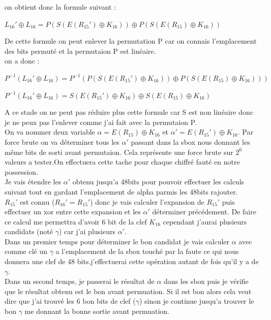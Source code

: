 \documentclass[a4paper]{report}
\begin{document}
			\newpage
			on obtient donc la formule suivant :
			\begin{center}$L_{16}'\oplus L_{16} = P(S(E(R_{15}')\oplus K_{16}))\oplus P(S(E(R_{15})\oplus K_{16})) $\end{center}
			
			De cette formule on peut enlever la permutation P car on connais l'emplacement des bits permuté et la permutaion P est linéaire.\\
			on a donc :
			\begin{center}$P^{-1}(L_{16}'\oplus L_{16}) =P^{-1}( P(S(E(R_{15}')\oplus K_{16}))\oplus P(S(E(R_{15})\oplus K_{16}))) $\end{center}
			\begin{center}$P^{-1}(L_{16}'\oplus L_{16}) =S(E(R_{15}')\oplus K_{16})\oplus S(E(R_{15})\oplus K_{16}) $\end{center}
			
			A ce stade on ne peut pas réduire plus cette formule car S est non linéaire donc je ne peux pas l'enlever comme j'ai fait avec la permutaion P.\\
			On va nommer deux variable $\alpha = E(R_{15})\oplus K_{16}$ et $\alpha' = E(R_{15}')\oplus K_{16}$.
			Par force brute on va déterminer tous les $\alpha'$ passant dans la sbox nous donnant les même bits de sorti avant permutaion. Cela représente une force brute sur $2^{6}$valeurs a tester.On effectuera cette tache pour chaque chiffré fauté en notre possession.\\
			Je vais étendre les $\alpha'$ obtenu jusqu'a 48bits pour pouvoir effectuer les calculs suivant tout en gardant l'emplacement de alpha parmis les 48bits rajouter.\\
			$R_{15}'$ est connu ($R_{16}'=R_{15}'$) donc je vais calculer l'expansion de $R_{15}'$ puis effectuer un xor entre cette expansion et les $\alpha'$ déterminer précédement. De faire ce calcul me permettra d'avoir 6 bit de la clef $K_{16}$ cependant j'aurai plusieurs candidats (noté $\gamma$) car j'ai plusieurs $\alpha'$.\\
			Dans un premier temps pour déterminer le bon candidat je vais calculer $\alpha$ avec comme clé un $\gamma$ a l'emplacement de la sbox touché par la faute ce qui nous donnera une clef de 48 bits.j'effectuerai cette opération autant de fois qu'il y a de $\gamma$.\\
			Dans un second temps, je passerai le résultat de $\alpha$ dans les sbox puis je vérifie que le résultat obtenu est le bon avant permuation. Si il est bon alors cela veut dire que j'ai trouvé les 6 bon bits de clef ($\gamma$) sinon je continue jusqu'a trouver le bon $\gamma$ me donnant la bonne sortie avant permuation.\\
			
\end{document}
